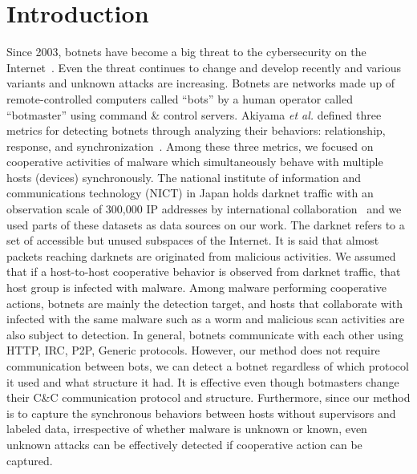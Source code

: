 \documentclass{sig-alternate-10pt}
\begin{document}
\section{Introduction}
Since 2003, botnets have become a big threat to the cybersecurity on the Internet~\cite{McCarty}.
Even the threat continues to change and develop recently and various variants and unknown attacks are increasing.
Botnets are networks made up of remote-controlled computers called ``bots'' by a human operator called ``botmaster'' using command \& control servers.
Akiyama {\it et al.} defined three metrics for detecting botnets through analyzing their behaviors: relationship, response, and synchronization~\cite{Akiyama}.
Among these three metrics, we focused on cooperative activities of malware which simultaneously behave with multiple hosts (devices) synchronously.
The national institute of information and communications technology (NICT) in Japan holds darknet traffic with an observation scale of 300,000 IP addresses by international collaboration~\cite{NICTERWEB} and we used parts of these datasets as data sources on our work.
The darknet refers to a set of accessible but unused subspaces of the Internet.
It is said that almost packets reaching darknets are originated from malicious activities.
We assumed that if a host-to-host cooperative behavior is observed from darknet traffic, that host group is infected with malware.
Among malware performing cooperative actions, botnets are mainly the detection target, and hosts that collaborate with infected with the same malware such as a worm and malicious scan activities are also subject to detection.
In general, botnets communicate with each other using HTTP, IRC, P2P, Generic protocols.
However, our method does not require communication between bots, we can detect a botnet regardless of which protocol it used and what structure it had.
It is effective even though botmasters change their C\&C communication protocol and structure.
Furthermore, since our method is to capture the synchronous behaviors between hosts without supervisors and labeled data, irrespective of whether malware is unknown or known, even unknown attacks can be effectively detected if cooperative action can be captured.
\end{document}

